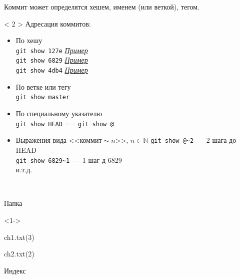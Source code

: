 \documentclass[9pt, aspectratio=1610]{beamer}
\begin{document}
\begin{frame}[fragile]
\begin{minipage}[t][\paperheight-3cm][t]{0.68\linewidth}
\begin{minipage}[t][5.2cm][t]{\linewidth}
\begin{onlyenv}
				Коммит может определятся хешем, именем (или веткой), тегом.					
			\end{onlyenv}	
			
			\begin{onlyenv}< 2 >%
				Адресация коммитов:\hypertarget{f:show_back}{ }
				
				\begin{itemize} 
					\item По хешу\\
						\Verb|git show 127e| \hyperlink{f:show1}{\color{cyan}\itshape Пример}\\
						\Verb|git show 6829| \hyperlink{f:show2}{\color{cyan}\itshape Пример}\\
						\Verb|git show 4db4| \hyperlink{f:show3}{\color{cyan}\itshape Пример}
					\item По ветке или тегу\\
						\Verb|git show master|\\
					\item По специальному указателю\\
						\Verb|git show HEAD| == \Verb|git show @|\\
					\item Выражения вида <<коммит${}\sim{}n$>>, $n\in\mathbb N$
					\Verb|git show @~2|~--- 2 шага до HEAD\\
					\Verb|git show 6829~1|~--- 1 шаг д 6829\\
					и.т.д.
				\end{itemize}
				
					
			\end{onlyenv}	
			
		\end{minipage}\\
		\begin{minipage}[t][3cm][t]{\linewidth}
			\begin{minipage}[t]{0.29\linewidth}
				\begin{exampleblock}{Папка\strut}  %
					
					\begin{onlyenv}<1->
						\strut ch1.txt(3)\rememb{a}
						
						\strut ch2.txt(2)\rememb{b}
					\end{onlyenv}
					
					
				\end{exampleblock}
			\end{minipage}\hfill%
			\begin{minipage}[t]{0.29\linewidth}
				\begin{exampleblock}{Индекс\strut}    %
					

\end{exampleblock}
\end{minipage}
\end{minipage}
\end{minipage}
\end{frame}
\end{document}
